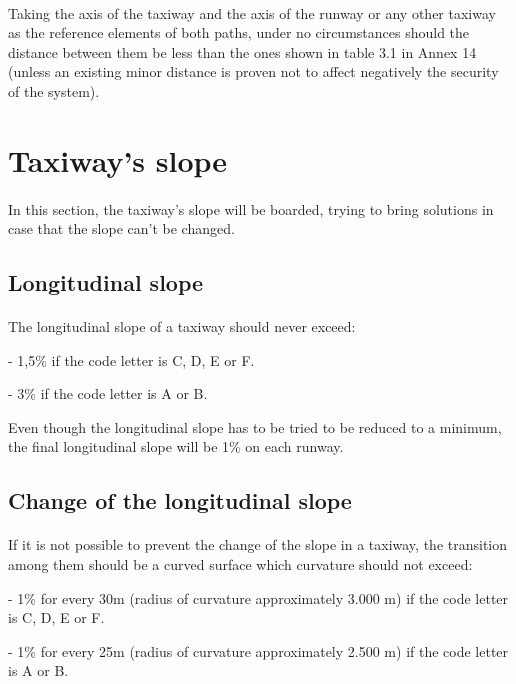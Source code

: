 	\paragraph{}Taking the axis of the taxiway and the axis of the runway or any other taxiway as the reference elements of both paths, under no circumstances should the distance between them be less than the ones shown in table 3.1 in Annex 14 (unless an existing minor distance is proven not to affect negatively the security of the system).
	
	\section{Taxiway's slope}
	\paragraph{}In this section, the taxiway's slope will be boarded, trying to bring solutions in case that the slope can't be changed. 
		\subsection{Longitudinal slope}
		\paragraph{}The longitudinal slope of a taxiway should never exceed:
		
		-	1,5\% if the code letter is C, D, E or F.
		
		-	3\% if the code letter is A or B.
		
		Even though the longitudinal slope has to be tried to be reduced to a minimum, the final longitudinal slope will be 1\% on each runway.
				
		\subsection{Change of the longitudinal slope}
		\paragraph{}If it is not possible to prevent the change of the slope in a taxiway, the transition among them should be a curved surface which curvature should not exceed:
		
		-	1\% for every 30m (radius of curvature approximately 3.000 m) if the code letter is C, D, E or F.
		
		-	1\% for every 25m (radius of curvature approximately 2.500 m) if the code letter is A or B.
	
